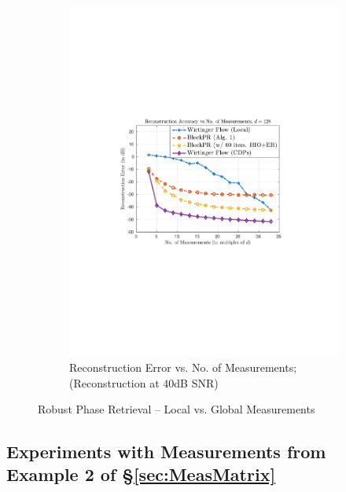 \begin{figure}[hbtp]
\begin{subfigure}[b]{0.495\textwidth}
\includegraphics[clip=true, trim = 1.5in 3.35in 1.5in 3.25in,scale=0.565]{pics/fig2b}
\caption{Reconstruction Error vs. No. of Measurements; (Reconstruction at $40$dB SNR)}
\label{fig:WF_meas}
\end{subfigure}
\caption{Robust Phase Retrieval -- Local vs. Global Measurements}
\label{fig:WF}
\end{figure}
%


\subsection{Experiments with Measurements from Example 2 of \S \ref{sec:MeasMatrix}}
\label{sec:SparseMeasureMasks}

